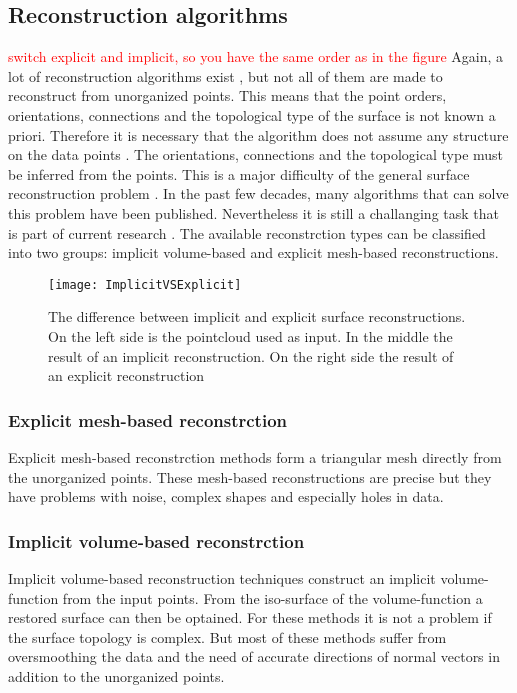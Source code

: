 \subsection{Reconstruction algorithms}
\textcolor{red}{ switch explicit and implicit, so you have the same order as in the figure}
Again, a lot of reconstruction algorithms exist \cite{lim2014surface}, but not
all of them are made to reconstruct from unorganized points. This means
that the point orders, orientations, connections and the topological type of the
surface is not known a priori. Therefore it is necessary that the algorithm does not assume any structure
on the data points \cite{hornung2006robust} \cite{yu1999surface}. The orientations, connections and the topological
type must be inferred from the points. This is a major difficulty of the general surface
reconstruction problem \cite{hoppe1992surface}. In the past few decades, many
algorithms that can solve this problem have been published. Nevertheless it is
still a challanging task that is part of current research \cite{li2018surface}.
The available reconstrction types can be classified into two groups: implicit
volume-based and explicit mesh-based reconstructions.
\begin{figure}[H]
  \centering
 \texttt{[image: ImplicitVSExplicit]}
 \caption{The difference between implicit and explicit surface reconstructions.
   On the left side is the pointcloud used as input. In the middle the result of an
   implicit reconstruction. On the right side the result of an explicit
   reconstruction \cite{stanfordPP}}
  \label{fig:ImplicitVSExplicit}
\end{figure}
\subsubsection{Explicit mesh-based reconstrction}
Explicit mesh-based reconstrction methods form a triangular mesh directly from
the unorganized points. These mesh-based reconstructions are precise but they
have problems with noise, complex shapes and especially holes in data.
\subsubsection{Implicit volume-based reconstrction}
Implicit volume-based reconstruction techniques construct an implicit
volume-function from the input points. From the iso-surface of the
volume-function a restored surface can then be optained. For these methods it is
not a problem if the surface topology is complex. But most of these methods
suffer from oversmoothing the data and the need of accurate directions of normal
vectors in addition to the unorganized points. 


